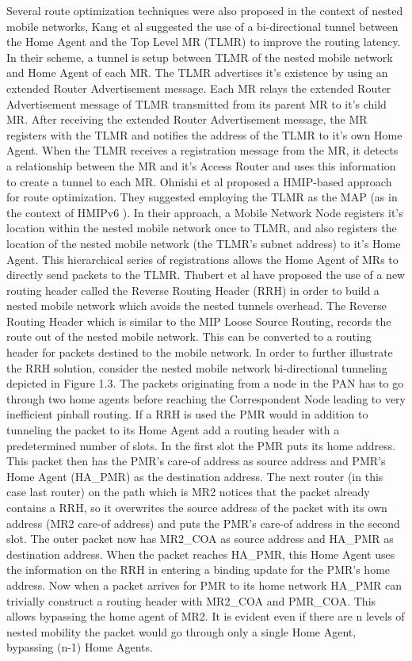Several route optimization techniques were also proposed in the context of
nested mobile networks, Kang et al \cite{28} suggested the use of a bi-directional
tunnel between the Home Agent and the Top Level MR (TLMR) to improve the routing latency. In their scheme, a tunnel is setup between TLMR of the nested mobile network and Home Agent of each MR. The TLMR advertises it's existence by using an extended Router Advertisement
message. Each MR relays the extended Router Advertisement message of TLMR
transmitted from its parent MR to it's child MR. After
receiving the extended Router Advertisement message, the MR
registers with the TLMR and notifies the address of the TLMR to it's own Home Agent. When
the  TLMR receives a registration message from the MR, it detects a
relationship between the MR and it's Access Router and uses this
information to create a tunnel to each MR. Ohnishi et al \cite{29}
proposed a HMIP-based approach for route optimization. They suggested employing
the TLMR as the MAP (as in the context of HMIPv6 \cite{30}). In
their approach, a Mobile Network Node registers it's location within the nested
mobile network once to TLMR, and also registers the location of the nested
mobile network (the TLMR's subnet address) to it's Home Agent. This
hierarchical series of registrations allows the Home Agent of MRs to directly
send packets to the TLMR.
Thubert et al \cite{31} have proposed the use of a new routing header called the Reverse
Routing Header (RRH) in order to build a nested mobile network which avoids
the nested tunnels overhead. The Reverse Routing Header which is similar to
the MIP Loose Source Routing, records the route out of the nested mobile
network. This can be converted to a routing header for packets destined to the
mobile network. In order to further illustrate the RRH solution, consider the
nested mobile network bi-directional tunneling depicted in Figure 1.3. The
packets originating from a node in the PAN has to go through two home agents
before reaching the Correspondent Node leading to very inefficient pinball
routing. If a RRH is used the PMR would in addition to tunneling the packet to
its Home Agent add a routing header with a predetermined number of slots. In
the first slot the PMR puts its home address. This packet then has the PMR's
care-of address as source address and PMR's Home Agent (HA\_PMR) as the
destination address. The next router (in this case last router) on the path
which is MR2 notices that the packet already contains a RRH, so it overwrites
the source address of the packet with its own address (MR2 care-of address)
and puts the PMR's care-of address in the second slot. The outer packet now
has MR2\_COA as source address and HA\_PMR as destination address. When the
packet reaches HA\_PMR, this Home Agent uses the information on the RRH in
entering a binding update for the PMR's home address. Now when a packet
arrives for PMR to its home network HA\_PMR can trivially construct a routing
header with MR2\_COA and PMR\_COA. This allows bypassing the home agent of
MR2. It is evident even if there are n levels of nested mobility the packet
would go through only a single Home Agent, bypassing (n-1) Home Agents.



